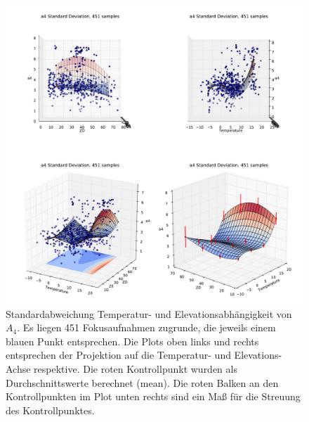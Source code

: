 \begin{figure}[H]
	\centering
	\includegraphics[scale=.48]{psf_surf/a4_std.pdf}
	\caption[Standardabweichung Temperatur- und Elevationsabhängigkeit von $A_4$]{Standardabweichung Temperatur- und Elevationsabhängigkeit von $A_4$. Es liegen 451 Fokusaufnahmen zugrunde, die jeweils einem blauen Punkt entsprechen. Die Plots oben links und rechts entsprechen der Projektion auf die Temperatur- und Elevations-Achse respektive. Die roten Kontrollpunkt wurden als Durchschnittswerte berechnet (mean). Die roten Balken an den Kontrollpunkten im Plot unten rechts sind ein Maß für die Streuung des Kontrollpunktes. }
    \label{psf_surf_a4_std_inline}
\end{figure}

